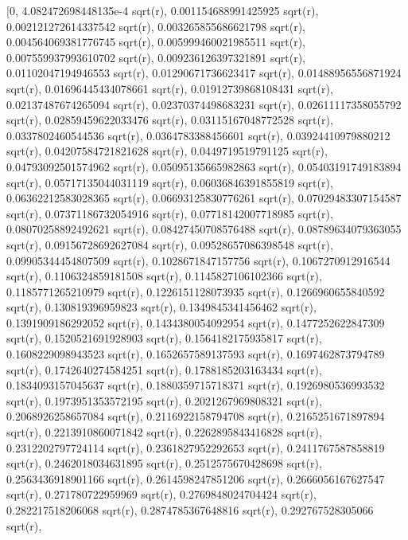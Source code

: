 \documentclass[12pt,arial,letterpaper]{book}
\begin{document}
\begin{eulercomment}
\begin{eulercomment}
\begin{eulercomment}
\begin{eulercomment}
\begin{eulercomment}
\begin{eulercomment}
\begin{eulercomment}
\begin{eulercomment}
\begin{eulercomment}
\begin{eulercomment}
\begin{eulercomment}
\begin{eulercomment}
\begin{eulercomment}
\begin{eulercomment}
\begin{eulercomment}
\begin{eulercomment}
\begin{eulercomment}
\begin{eulercomment}
\begin{eulercomment}
\begin{eulercomment}
\begin{eulercomment}
\begin{eulercomment}
\begin{euleroutput}
          [0, 4.082472698448135e-4 sqrt(r), 
  0.001154688991425925 sqrt(r), 0.002121272614337542 sqrt(r), 
  0.003265855686621798 sqrt(r), 0.004564069381776745 sqrt(r), 
  0.005999460021985511 sqrt(r), 0.007559937993610702 sqrt(r), 
  0.009236126397321891 sqrt(r), 0.01102047194946553 sqrt(r), 
  0.01290671736623417 sqrt(r), 0.01488956556871924 sqrt(r), 
  0.01696445434078661 sqrt(r), 0.01912739868108431 sqrt(r), 
  0.02137487674265094 sqrt(r), 0.02370374498683231 sqrt(r), 
  0.02611117358055792 sqrt(r), 0.02859459622033476 sqrt(r), 
  0.03115167048772528 sqrt(r), 0.0337802460544536 sqrt(r), 
  0.0364783388456601 sqrt(r), 0.03924410979880212 sqrt(r), 
  0.04207584721821628 sqrt(r), 0.0449719519791125 sqrt(r), 
  0.04793092501574962 sqrt(r), 0.05095135665982863 sqrt(r), 
  0.05403191749183894 sqrt(r), 0.05717135044031119 sqrt(r), 
  0.06036846391855819 sqrt(r), 0.06362212583028365 sqrt(r), 
  0.06693125830776261 sqrt(r), 0.07029483307154587 sqrt(r), 
  0.07371186732054916 sqrt(r), 0.07718142007718985 sqrt(r), 
  0.08070258892492621 sqrt(r), 0.08427450708576488 sqrt(r), 
  0.08789634079363055 sqrt(r), 0.09156728692627084 sqrt(r), 
  0.09528657086398548 sqrt(r), 0.09905344454807509 sqrt(r), 
  0.1028671847157756 sqrt(r), 0.1067270912916544 sqrt(r), 
  0.1106324859181508 sqrt(r), 0.1145827106102366 sqrt(r), 
  0.1185771265210979 sqrt(r), 0.1226151128073935 sqrt(r), 
  0.1266960655840592 sqrt(r), 0.130819396959823 sqrt(r), 
  0.1349845341456462 sqrt(r), 0.1391909186292052 sqrt(r), 
  0.1434380054092954 sqrt(r), 0.1477252622847309 sqrt(r), 
  0.1520521691928903 sqrt(r), 0.1564182175935817 sqrt(r), 
  0.1608229098943523 sqrt(r), 0.1652657589137593 sqrt(r), 
  0.1697462873794789 sqrt(r), 0.1742640274584251 sqrt(r), 
  0.1788185203163434 sqrt(r), 0.1834093157045637 sqrt(r), 
  0.1880359715718371 sqrt(r), 0.1926980536993532 sqrt(r), 
  0.1973951353572195 sqrt(r), 0.2021267969808321 sqrt(r), 
  0.2068926258657084 sqrt(r), 0.2116922158794708 sqrt(r), 
  0.2165251671897894 sqrt(r), 0.2213910860071842 sqrt(r), 
  0.2262895843416828 sqrt(r), 0.2312202797724114 sqrt(r), 
  0.2361827952292653 sqrt(r), 0.2411767587858819 sqrt(r), 
  0.2462018034631895 sqrt(r), 0.2512575670428698 sqrt(r), 
  0.2563436918901166 sqrt(r), 0.2614598247851206 sqrt(r), 
  0.2666056167627547 sqrt(r), 0.271780722959969 sqrt(r), 
  0.2769848024704424 sqrt(r), 0.282217518206068 sqrt(r), 
  0.2874785367648816 sqrt(r), 0.292767528305066 sqrt(r), 

\end{euleroutput}
\end{eulercomment}
\end{eulercomment}
\end{eulercomment}
\end{eulercomment}
\end{eulercomment}
\end{eulercomment}
\end{eulercomment}
\end{eulercomment}
\end{eulercomment}
\end{eulercomment}
\end{eulercomment}
\end{eulercomment}
\end{eulercomment}
\end{eulercomment}
\end{eulercomment}
\end{eulercomment}
\end{eulercomment}
\end{eulercomment}
\end{eulercomment}
\end{eulercomment}
\end{eulercomment}
\end{eulercomment}
\end{document}
